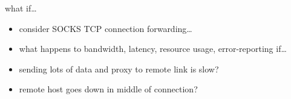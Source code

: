 \begin{frame}{what if\ldots}
    \begin{itemize}
    \item consider SOCKS TCP connection forwarding\ldots
    \item what happens to bandwidth, latency, resource usage, error-reporting if\ldots
    \vspace{.5cm}
    \item sending lots of data and proxy to remote link is slow?
    \item remote host goes down in middle of connection?
    \end{itemize}
\end{frame}
